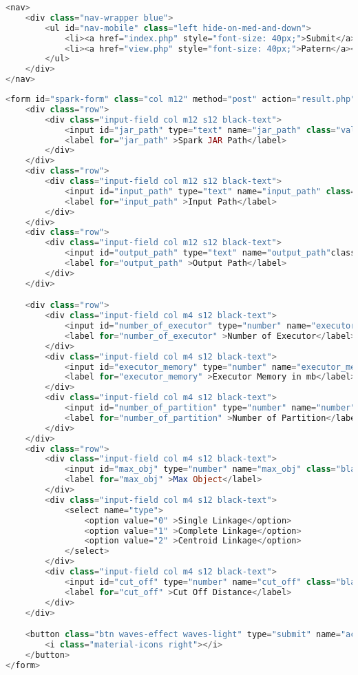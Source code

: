 \begin{lstlisting}[language=PHP, caption=nav.php]
<nav>
    <div class="nav-wrapper blue">
      	<ul id="nav-mobile" class="left hide-on-med-and-down">
	        <li><a href="index.php" style="font-size: 40px;">Submit</a></li>
	        <li><a href="view.php" style="font-size: 40px;">Patern</a></li>
      	</ul>
    </div>
</nav>
\end{lstlisting}

\begin{lstlisting}[language=PHP, caption=form.php]
<form id="spark-form" class="col m12" method="post" action="result.php" style="font-size: 20px;">
	<div class="row">
		<div class="input-field col m12 s12 black-text">
			<input id="jar_path" type="text" name="jar_path" class="validate">
			<label for="jar_path" >Spark JAR Path</label>
		</div>
	</div>
	<div class="row">
		<div class="input-field col m12 s12 black-text">
			<input id="input_path" type="text" name="input_path" class="black-text">
			<label for="input_path" >Input Path</label>
		</div>
	</div>
	<div class="row">
		<div class="input-field col m12 s12 black-text">
			<input id="output_path" type="text" name="output_path"class="black-text">
			<label for="output_path" >Output Path</label>
		</div>
	</div>

	<div class="row">
		<div class="input-field col m4 s12 black-text">
			<input id="number_of_executor" type="number" name="executor_number" class="black-text" value="1" min="1" step="1" max="100">
			<label for="number_of_executor" >Number of Executor</label>
		</div>
		<div class="input-field col m4 s12 black-text">
			<input id="executor_memory" type="number" name="executor_memory" class="black-text" value="1000" min="1000" step="100">
			<label for="executor_memory" >Executor Memory in mb</label>
		</div>
		<div class="input-field col m4 s12 black-text">
			<input id="number_of_partition" type="number" name="number" class="black-text" value="1" min="1" step="1" max="200">
			<label for="number_of_partition" >Number of Partition</label>
		</div>
	</div>
	<div class="row">
		<div class="input-field col m4 s12 black-text">
			<input id="max_obj" type="number" name="max_obj" class="black-text" value="1" min="1" step="1" max="100">
			<label for="max_obj" >Max Object</label>
		</div>
		<div class="input-field col m4 s12 black-text">
			<select name="type">
				<option value="0" >Single Linkage</option>
				<option value="1" >Complete Linkage</option>
				<option value="2" >Centroid Linkage</option>
			</select>
		</div>
		<div class="input-field col m4 s12 black-text">
			<input id="cut_off" type="number" name="cut_off" class="black-text" value="0.1" min="0.1" step="0.1" max="1">
			<label for="cut_off" >Cut Off Distance</label>
		</div>
	</div>

	<button class="btn waves-effect waves-light" type="submit" name="action">Submit
		<i class="material-icons right"></i>
	</button>
</form>
\end{lstlisting}

